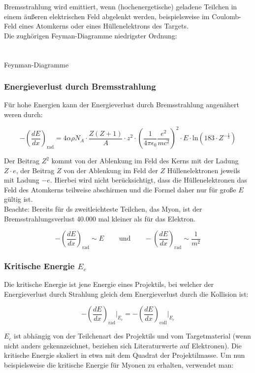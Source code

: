 Bremsstrahlung wird emittiert, wenn (hochenergetische) geladene Teilchen in einem äußeren
elektrischen Feld abgelenkt werden, beispielsweise im Coulomb-Feld eines Atomkerns oder eines
Hüllenelektrons des Targets.
\\
Die zughörigen Feyman-Diagramme niedrigster Ordnung:
\\
\\
\\
Feynman-Diagramme






\subsubsection*{Energieverlust durch Bremsstrahlung}

Für hohe Energien kann der Energieverlust durch Bremsstrahlung angenähert weren durch:

\[-\left(\frac{dE}{dx}\right)_{\text{rad}} = 4\alpha \rho N_A \cdot \frac{Z(Z+1)}{A} \cdot z^2\cdot
\left(\frac{1}{4\pi \epsilon_0} \frac{e^2}{mc^2} \right)^2 \cdot E\cdot \text{ln}(183\cdot
Z^{-\frac{1}{3}}) \]

Der Beitrag $Z^2$ kommt von der Ablenkung im Feld des Kerns mit der Ladung $Z\cdot e$, der Beitrag
$Z$ von der Ablenkung im Feld der $Z$ Hüllenelektronen jeweils mit Ladung $-e$. Hierbei wird nicht
berücksichtigt, dass die Hüllenelektronen das Feld des Atomkerns teilweise abschirmen und die Formel
daher nur für große $E$ gültig ist.
\\
Beachte: Bereits für ds zweitleichteste Teilchen, das Myon, ist der Bremsstrahlungsverlust 40.000
mal kleiner als für das Elektron. 

\[-\left(\frac{dE}{dx}\right)_{\text{rad}} \sim E~~~~~~~~~~\text{und}~~~~~~~~~
-\left(\frac{dE}{dx}\right)_{\text{rad}} \sim \frac{1}{m^2}\]

\subsubsection*{Kritische Energie $E_c$}

Die kritische Energie ist jene Energie eines Projektils, bei welcher der Energieverlust durch
Strahlung gleich dem Energieverlust durch die Kollision ist:

\[-\left(\frac{dE}{dx}\right)_{\text{rad}} \bigg|_{E_c} = -\left(\frac{dE}{dx}\right)_{\text{coll}}
\bigg|_{E_c}  \]

$E_c$ ist abhängig von der Teilchenart des Projektils und vom Targetmaterial (wenn nicht anders
gekennzeichnet, beziehen sich Literaturwerte auf Elektronen). Die kritische Energie skaliert in etwa
mit dem Quadrat der Projektilmasse. Um nun beispielsweise die kritische Energie für Myonen zu
erhalten, verwendet man:

